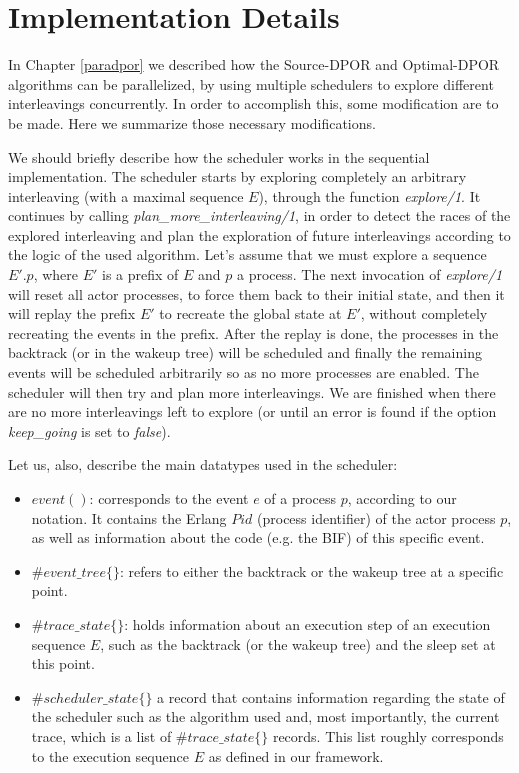\chapter{Implementation Details}
\label{conc_mods}

In Chapter \ref{paradpor} we described how the Source-DPOR and Optimal-DPOR algorithms can be parallelized, by using multiple schedulers
to explore different interleavings concurrently. In order to accomplish this, some modification are to be made.
Here we summarize those necessary modifications.

We should briefly describe how the scheduler works in the sequential implementation. The scheduler starts by exploring completely an arbitrary interleaving (with a maximal sequence $E$), 
through the function \textit{explore/1}.
It continues by calling \textit{plan\_more\_interleaving/1}, in order to detect the races of the explored interleaving and plan the exploration of 
future interleavings according to the logic of the used algorithm. Let's assume that we must explore a sequence $E'.p$, where $E'$ is a prefix
of $E$ and $p$ a process. The next invocation of \textit{explore/1} will reset all actor processes, to force them back to their initial state, and
then it will replay the prefix $E'$ to recreate the global state at $E'$, without completely recreating the events in the prefix. After the replay is done,
the processes in the backtrack (or in the wakeup tree) will be scheduled and finally the remaining events will be scheduled arbitrarily so as no
more processes are enabled. The scheduler will then try and plan more interleavings. We are finished when there are no more interleavings left to explore
(or until an error is found if the option \textit{keep\_going} is set to \textit{false}).

Let us, also, describe the main datatypes used in the scheduler:
\begin{itemize} 
\item $event()$: corresponds to the event $e$ of a process $p$, according to our notation. It contains the
Erlang $Pid$ (process identifier) of the actor process $p$, as well as information about the code (e.g. the BIF) of this specific event.
\item $\#event\_tree\{\}$: refers to either the backtrack or the wakeup tree at a specific point.
\item $\#trace\_state\{\}$: holds information about an execution step of an execution sequence $E$, 
such as the backtrack (or the wakeup tree) and the sleep set at this point.
\item $\#scheduler\_state\{\}$ a record that contains information regarding the state of the scheduler
such as the algorithm used and, most importantly, the current trace, which is a list of $\#trace\_state\{\}$ records. This list
roughly corresponds to the execution sequence $E$ as defined in our framework.
\end{itemize}

